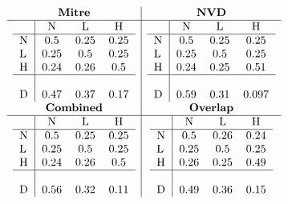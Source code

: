 \documentclass[11pt]{article}
\begin{document}
\begin{table}
	\centering
	\caption{Confusion matrices privilegesRequired}
	\[
		\begin{array}{c|c}
			\label{table:mitre-privilegesRequired}
			\textbf{Mitre}    & \textbf{NVD}     \\
			\hline
			\begin{tabular}{l|ccc}
				  & N    & L    & H    \\
				\hline
				N & 0.5  & 0.25 & 0.25 \\
				L & 0.25 & 0.5  & 0.25 \\
				H & 0.24 & 0.26 & 0.5  \\
				\hline                 \\
				D & 0.47 & 0.37 & 0.17 \\
			\end{tabular}
			                  &
			\begin{tabular}{l|ccc}
				  & N    & L    & H     \\
				\hline
				N & 0.5  & 0.25 & 0.25  \\
				L & 0.25 & 0.5  & 0.25  \\
				H & 0.24 & 0.25 & 0.51  \\
				\hline                  \\
				D & 0.59 & 0.31 & 0.097 \\
			\end{tabular}
			\\
			\textbf{Combined} & \textbf{Overlap} \\
			\hline
			\begin{tabular}{l|ccc}
				  & N    & L    & H    \\
				\hline
				N & 0.5  & 0.25 & 0.25 \\
				L & 0.25 & 0.5  & 0.25 \\
				H & 0.24 & 0.26 & 0.5  \\
				\hline                 \\
				D & 0.56 & 0.32 & 0.11 \\
			\end{tabular}
			                  &
			\begin{tabular}{l|ccc}
				  & N    & L    & H    \\
				\hline
				N & 0.5  & 0.26 & 0.24 \\
				L & 0.25 & 0.5  & 0.25 \\
				H & 0.26 & 0.25 & 0.49 \\
				\hline                 \\
				D & 0.49 & 0.36 & 0.15 \\
			\end{tabular}
		\end{array}
	\]
\end{table}
\end{document}
